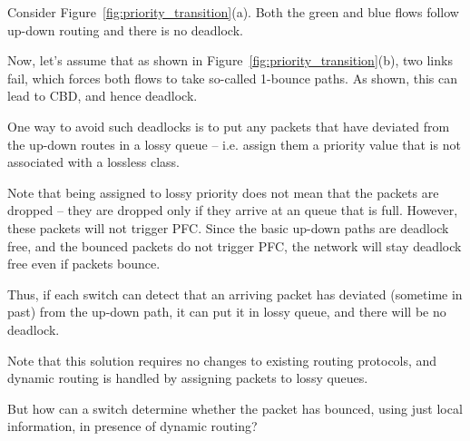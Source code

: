 Consider Figure~\ref{fig:priority_transition}(a). Both the green and blue flows
follow up-down routing and there is no deadlock. 

Now, let's assume that as shown in Figure~\ref{fig:priority_transition}(b), two
links fail, which forces both flows to take so-called 1-bounce paths. As shown,
this can lead to CBD, and hence deadlock.

One way to avoid such deadlocks is to put any packets that have deviated from
the up-down routes in a lossy queue -- i.e. assign them a priority value that is
not associated with a lossless class.  

Note that being assigned to lossy priority does not mean that the packets are
dropped -- they are dropped only if they arrive at an queue that is
full. However, these packets will not trigger PFC. Since the basic up-down paths
are deadlock free, and the bounced packets do not trigger PFC, the network will
stay deadlock free even if packets bounce.

Thus, if each switch can detect that an arriving packet has deviated (sometime
in past) from the up-down path, it can put it in lossy queue, and there will be
no deadlock.

Note that this solution requires no changes to existing routing protocols, and
dynamic routing is handled by assigning packets to lossy queues.

But how can a switch determine whether the packet has bounced, using just local
information, in presence of dynamic routing?


